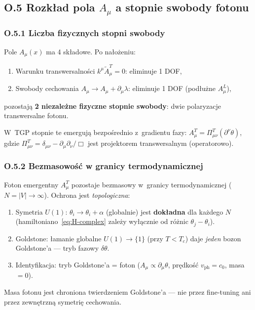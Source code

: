 \subsection*{O.5 Rozkład pola $A_\mu$ a stopnie swobody fotonu}
\label{ssec:dof_photon}

\subsubsection*{O.5.1 Liczba fizycznych stopni swobody}

\begin{propozycja}
\label{prop:2_dof_photon}
Pole $A_\mu(x)$ ma 4 składowe. Po nałożeniu:
\begin{enumerate}
  \item Warunku transwersalności $k^\mu \tilde{A}_\mu^T = 0$: eliminuje 1 DOF,
  \item Swobody cechowania $A_\mu \to A_\mu + \partial_\mu\lambda$: eliminuje 1 DOF (podłużne $A_\mu^L$),
\end{enumerate}
pozostają \textbf{2 niezależne fizyczne stopnie swobody}: dwie
polaryzacje transwersalne fotonu.

W~TGP stopnie te emergują bezpośrednio z~gradientu fazy:
$A_\mu^T = \Pi_{\mu\nu}^T(\partial^\nu\theta)$,
gdzie $\Pi_{\mu\nu}^T = \delta_{\mu\nu} - \partial_\mu\partial_\nu/\Box$
jest projektorem transwersalnym (operatorowo).
\end{propozycja}

\subsubsection*{O.5.2 Bezmasowość w granicy termodynamicznej}

\begin{twierdzenie}
\label{thm:photon_massless_protection}
Foton emergentny $A_\mu^T$ pozostaje bezmasowy w~granicy
termodynamicznej ($N = |V| \to \infty$). Ochrona jest \emph{topologiczna}:
\begin{enumerate}
  \item Symetria $U(1)$: $\theta_i \to \theta_i + \alpha$ (globalnie)
        jest \textbf{dokładna} dla każdego $N$ (hamiltoniano~\eqref{eq:H-complex}
        zależy wyłącznie od różnic $\theta_j - \theta_i$).
  \item Goldstone: łamanie globalne $U(1) \to \{1\}$ (przy $T < T_c$)
        daje \emph{jeden} bozon Goldstone'a --- tryb fazowy $\delta\theta$.
  \item Identyfikacja: tryb Goldstone'a = foton ($A_\mu \propto \partial_\mu\theta$,
        prędkość $v_\mathrm{ph} = c_0$, masa $= 0$).
\end{enumerate}
Masa fotonu jest chroniona twierdzeniem Goldstone'a --- nie przez
fine-tuning ani przez zewnętrzną symetrię cechowania.
\end{twierdzenie}

